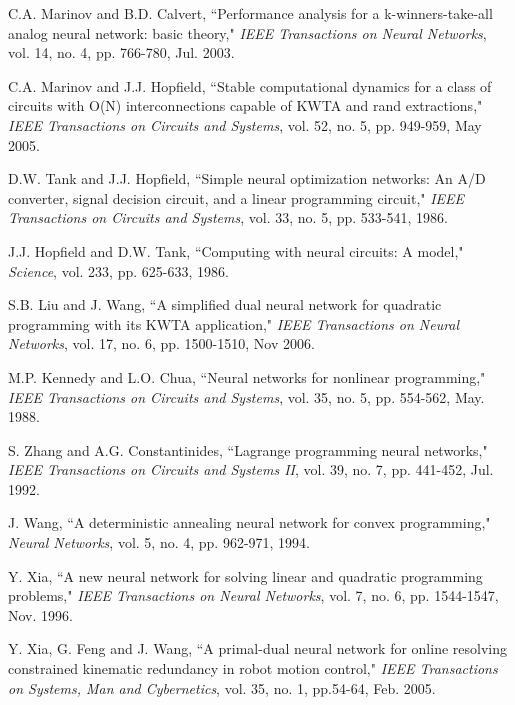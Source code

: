 \documentclass[conference]{IEEEtran}
\begin{document}
\begin{thebibliography}{22}
 C.A. Marinov and B.D. Calvert, ``Performance analysis for a k-winners-take-all analog neural network: basic theory,"
        {\it IEEE Transactions on Neural Networks}, vol. 14, no. 4, pp. 766-780, Jul. 2003.

 C.A. Marinov and J.J. Hopfield, ``Stable computational dynamics for a class of circuits with O(N) interconnections capable of KWTA and rand extractions,"
        {\it IEEE Transactions on Circuits and Systems}, vol. 52, no. 5, pp. 949-959, May 2005.

 D.W. Tank and J.J. Hopfield, ``Simple neural optimization networks: An A/D converter, signal decision circuit, and a linear programming circuit,"
        {\it IEEE Transactions on Circuits and Systems}, vol. 33, no. 5, pp. 533-541, 1986.

 J.J. Hopfield and D.W. Tank, ``Computing with neural circuits: A model,"
        {\it Science}, vol. 233, pp. 625-633, 1986.



 S.B. Liu and J. Wang, ``A simplified dual neural network for quadratic programming with its KWTA application,"
        {\it IEEE Transactions on Neural Networks}, vol. 17, no. 6, pp. 1500-1510, Nov 2006.



 M.P. Kennedy and L.O. Chua, ``Neural networks for nonlinear programming,"
        {\it IEEE Transactions on Circuits and Systems}, vol. 35, no. 5, pp. 554-562, May. 1988.

 S. Zhang and A.G. Constantinides, ``Lagrange programming neural networks,"
        {\it IEEE Transactions on Circuits and Systems II}, vol. 39, no. 7, pp. 441-452, Jul. 1992.

 J. Wang, ``A deterministic annealing neural network for convex programming,"
        {\it Neural Networks}, vol. 5, no. 4, pp. 962-971, 1994.

 Y. Xia, ``A new neural network for solving linear and quadratic programming problems,"
        {\it IEEE Transactions on Neural Networks}, vol. 7, no. 6, pp. 1544-1547, Nov. 1996.

 Y. Xia, G. Feng and J. Wang, ``A primal-dual neural network for online resolving constrained kinematic redundancy in robot motion control,"
        {\it IEEE Transactions on Systems, Man and Cybernetics}, vol. 35, no. 1, pp.54-64, Feb. 2005.


\end{thebibliography}
\end{document}
